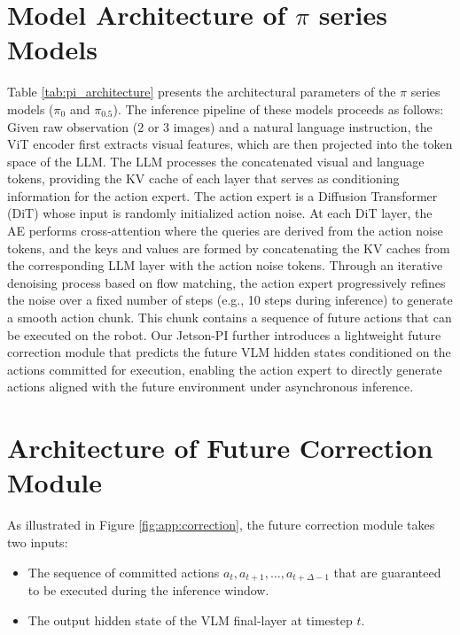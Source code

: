 \section{Model Architecture of $\pi$ series Models}
\label{sec:appendix:pi_arch}
Table \ref{tab:pi_architecture} presents the architectural parameters of the $\pi$ series models ($\pi_0$ and $\pi_{0.5}$). The inference pipeline of these models proceeds as follows: 
Given raw observation (2 or 3 images) and a natural language instruction, the ViT encoder first extracts visual features, which are then projected into the token space of the LLM. The LLM processes the concatenated visual and language tokens, providing the KV cache of each layer that serves as conditioning information for the action expert. 
The action expert is a Diffusion Transformer (DiT) whose input is randomly initialized action noise. At each DiT layer, the AE performs cross‑attention where the queries are derived from the action noise tokens, and the keys and values are formed by concatenating the KV caches from the corresponding LLM layer with the action noise tokens.
Through an iterative denoising process based on flow matching, the action expert progressively refines the noise over a fixed number of steps (e.g., 10 steps during inference) to generate a smooth action chunk. This chunk contains a sequence of future actions that can be executed on the robot. Our Jetson-PI further introduces a lightweight future correction module that predicts the future VLM hidden states conditioned on the actions committed for execution, enabling the action expert to directly generate actions aligned with the future environment under asynchronous inference.






\section{Architecture of Future Correction Module}
\label{sec:appendix:correction_arch}

As illustrated in Figure \ref{fig:app:correction}, the future correction module takes two inputs:
\begin{itemize}
    \item The sequence of committed actions \(a_t, a_{t+1}, \dots, a_{t+\Delta-1}\) that are guaranteed to be executed during the inference window.
    \item The output hidden state of the VLM final-layer at timestep $t$.
\end{itemize}

